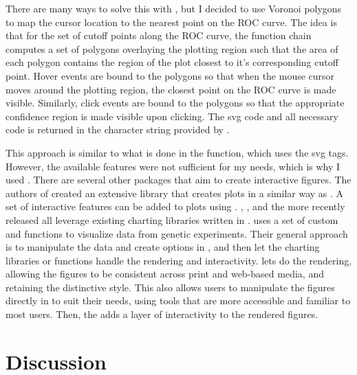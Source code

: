\documentclass[codesnippet]{jss}
\begin{document}
There are many ways to solve this with , but I decided to use
Voronoi polygons to map the cursor location to the nearest point on the
ROC curve. The idea is that for the set of cutoff points along the ROC
curve, the  function chain computes a set of
polygons overlaying the plotting region such that the area of each
polygon contains the region of the plot closest to it's corresponding
cutoff point. Hover events are bound to the polygons so that when the
mouse cursor moves around the plotting region, the closest point on the
ROC curve is made visible. Similarly, click events are bound to the
polygons so that the appropriate confidence region is made visible upon
clicking. The svg code and all necessary  code is
returned in the character string provided by
.

This approach is similar to what is done in the 
 function, which uses the svg 
tags. However, the available features were not sufficient for my needs,
which is why I used . There are several other 
packages that aim to create interactive figures. The authors of
 \citep{animint} created an extensive 
library that creates plots in a similar way as . A set of
interactive features can be added to plots using .
 \citep{ggvis},  \citep{rcharts}, and the more
recently released  \citep{htmlwidgets} all leverage
existing charting libraries written in .
 \citep{qtlcharts} uses a set of custom
 and  functions to visualize data from
genetic experiments. Their general approach is to manipulate the data
and create options in , and then let the charting libraries
or functions handle the rendering and interactivity.  lets
 do the rendering, allowing the figures to be consistent
across print and web-based media, and retaining the distinctive
 style. This also allows users to manipulate the figures
directly in  to suit their needs, using tools that are more
accessible and familiar to most  users. Then, the
 adds a layer of interactivity to the rendered
figures.

\section{Discussion}\label{discussion}
\end{document}
